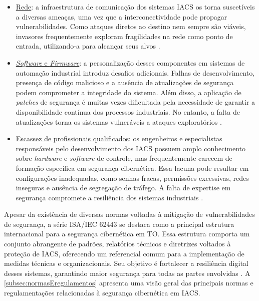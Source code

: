     \begin{itemize}
        \item \underline{Rede}: a infraestrutura de comunicação dos sistemas IACS os torna suscetíveis a diversas ameaças, uma vez que a interconectividade pode propagar vulnerabilidades. Como ataques diretos ao destino nem sempre são viáveis, invasores frequentemente exploram fragilidades na rede como ponto de entrada, utilizando-a para alcançar seus alvos \cite{li2020}.
        \item \underline{\textit{Software} e \textit{Firmware}}: a personalização desses componentes em sistemas de automação industrial introduz desafios adicionais. Falhas de desenvolvimento, presença de código malicioso e a ausência de atualizações de segurança podem comprometer a integridade do sistema. Além disso, a aplicação de \textit{patches} de segurança é muitas vezes dificultada pela necessidade de garantir a disponibilidade contínua dos processos industriais. No entanto, a falta de atualizações torna os sistemas vulneráveis a ataques exploratórios \cite{maidl2021}.
        \item \underline{Escassez de profissionais qualificados}: os engenheiros e especialistas responsáveis pelo desenvolvimento dos IACS possuem amplo conhecimento sobre \textit{hardware} e \textit{software} de controle, mas frequentemente carecem de formação específica em segurança cibernética. Essa lacuna pode resultar em configurações inadequadas, como senhas fracas, permissões excessivas, redes inseguras e ausência de segregação de tráfego. A falta de expertise em segurança compromete a resiliência dos sistemas industriais \cite{graham2016}.
    \end{itemize}

    Apesar da existência de diversas normas voltadas à mitigação de vulnerabilidades de segurança, a série ISA/IEC 62443 se destaca como a principal estrutura internacional para a segurança cibernética em TO. Essa estrutura comporta um conjunto abrangente de padrões, relatórios técnicos e diretrizes voltados à proteção de IACS, oferecendo um referencial comum para a implementação de medidas técnicas e organizacionais. Seu objetivo é fortalecer a resiliência digital desses sistemas, garantindo maior segurança para todas as partes envolvidas \cite{wiboonrat2022}. A \autoref{subsec:normasEregulamentos} apresenta uma visão geral das principais normas e regulamentações relacionadas à segurança cibernética em IACS.

